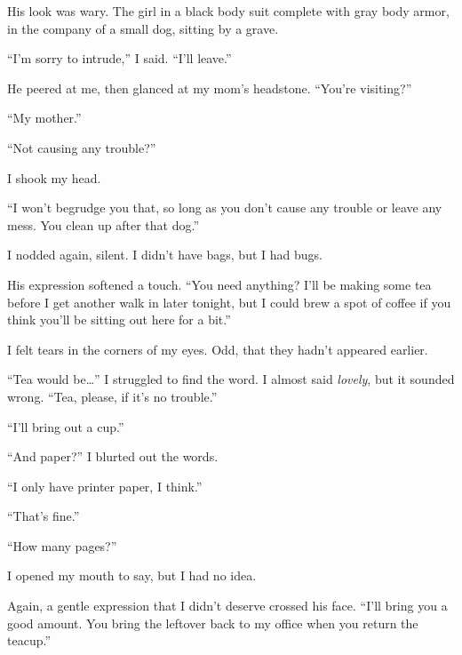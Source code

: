 His look was wary.  The girl in a black body suit complete with gray body armor, in the company of a small dog, sitting by a grave.



``I'm sorry to intrude,'' I said.  ``I'll leave.''



He peered at me, then glanced at my mom's headstone.  ``You're visiting?''



``My mother.''



``Not causing any trouble?''



I shook my head.



``I won't begrudge you that, so long as you don't cause any trouble or leave any mess.  You clean up after that dog.''



I nodded again, silent.  I didn't have bags, but I had bugs.



His expression softened a touch.  ``You need anything?  I'll be making some tea before I get another walk in later tonight, but I could brew a spot of coffee if you think you'll be sitting out here for a bit.''



I felt tears in the corners of my eyes.  Odd, that they hadn't appeared earlier.



``Tea would be\ldots'' I struggled to find the word.  I almost said \emph{lovely}, but it sounded wrong.  ``Tea, please, if it's no trouble.''



``I'll bring out a cup.''



``And paper?''  I blurted out the words.



``I only have printer paper, I think.''



``That's fine.''



``How many pages?''



I opened my mouth to say, but I had no idea.



Again, a gentle expression that I didn't deserve crossed his face.  ``I'll bring you a good amount.  You bring the leftover back to my office when you return the teacup.''




